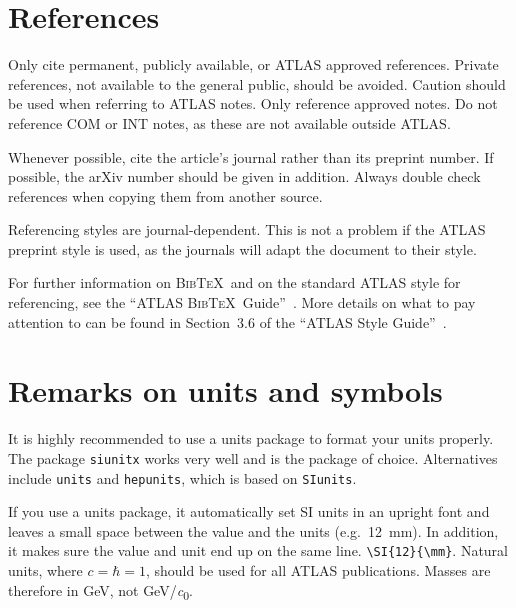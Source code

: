 \documentclass[UKenglish]{latex/atlasdoc}
\newcommand{\BibTeX}{\textsc{Bib\TeX}}
\begin{document}
\section{References}
\label{sec:refs}

Only cite permanent, publicly available, or ATLAS approved references.
Private references, not available to the general public, should be
avoided. Caution should be used when referring to ATLAS notes.
Only reference approved notes. Do not reference COM or INT notes,
as these are not available outside ATLAS.

Whenever possible, cite the article's journal rather than its preprint number. 
If possible, the arXiv number should be given in addition.
Always double check references when copying them from another source.

Referencing styles are journal-dependent.
This is not a problem if the ATLAS preprint style is used,
as the journals will adapt the document to their style.

For further information on \BibTeX\ and on the standard ATLAS style for referencing, 
see the ``ATLAS \BibTeX\ Guide''~\cite{atlas-bibtex}.
More details on what to pay attention to can be found in Section~3.6 of the \enquote{ATLAS Style Guide}~\cite{atlas-style}.


\section{Remarks on units and symbols}
\label{sec:units}

It is highly recommended to use a units package to format your units properly.
The package \texttt{siunitx} works very well and is the package of choice.
Alternatives include \texttt{units} and \texttt{hepunits},
which is based on \texttt{SIunits}.

If you use a units package, it automatically set SI units in an upright font
and leaves a small space between
the value and the units (e.g.\ \SI{12}{\mm}). 
In addition, it makes sure the value and unit end up on the same line. \verb|\SI{12}{\mm}|.
Natural units, where $c=\hbar=1$, should be used for all
ATLAS publications. Masses are therefore in \si{\GeV}, not \si[per-mode=symbol]{\GeV\per\clight}.
\end{document}
